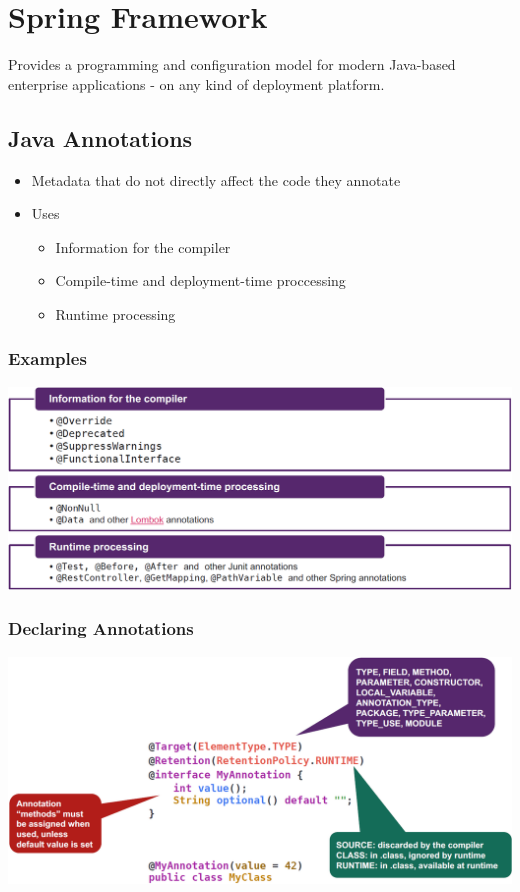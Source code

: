\section{Spring Framework}
Provides a programming and configuration model for modern Java-based enterprise applications - on any kind of deployment platform.

\subsection{Java Annotations}
\begin{itemize}
    \item Metadata that do not directly affect the code they annotate
    \item Uses
    \begin{itemize}
        \item Information for the compiler
        \item Compile-time and deployment-time proccessing
        \item Runtime processing
    \end{itemize}
\end{itemize}
\subsubsection{Examples}
\includegraphics[width=\linewidth]{./img/annotation.png}
\subsubsection{Declaring Annotations}
\includegraphics[width=\linewidth]{./img/annotation_declaration.png}

